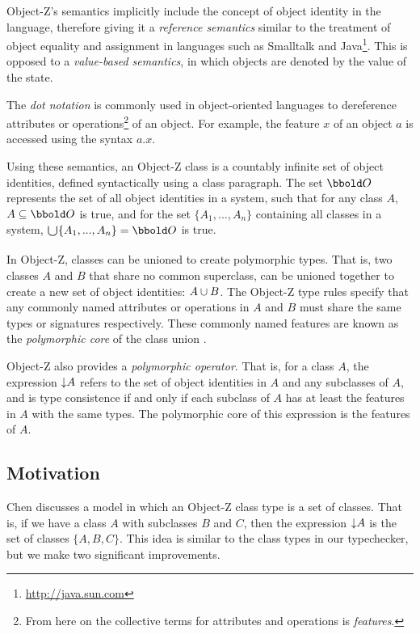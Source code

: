 Object-Z's semantics implicitly include the concept of object identity
in the language, therefore giving it a {\em reference semantics}
similar to the treatment of object equality and assignment in
languages such as Smalltalk \cite{goldberg83} and
Java\footnote{\url{http://java.sun.com}}. This is opposed to a {\em
value-based semantics}, in which objects are denoted by the value of
the state.

The {\em dot notation} is commonly used in object-oriented languages
to dereference attributes or operations\footnote{From here on
the collective terms for attributes and operations is {\em features}.}
of an object. For example, the feature $x$ of an object $a$ is
accessed using the syntax $a.x$.

Using these semantics, an Object-Z class is a countably infinite set
of object identities, defined syntactically using a class
paragraph. The set $\oid$ represents the set of all object identities
in a system, such that for any class $A$, $A \subseteq \oid$ is true,
and for the set $\{ A_{1}, ..., A_{n} \}$ containing all classes in a
system, $\duni \{ A_{1}, ..., A_{n} \} = \oid$ is true.

In Object-Z, classes can be unioned to create polymorphic types. That
is, two classes $A$ and $B$ that share no common superclass, can be
unioned together to create a new set of object identities: $A
\classuni B$. The Object-Z type rules specify that any commonly named
attributes or operations in $A$ and $B$ must share the same types or
signatures respectively. These commonly named features are known as
the {\em polymorphic core} of the class union \cite{dong93}.

Object-Z also provides a {\em polymorphic operator}. That is, for a
class $A$, the expression $\mathord\downarrow A$ refers to the set of object
identities in $A$ and any subclasses of $A$, and is type consistence
if and only if each subclass of $A$ has at least the features in $A$
with the same types. The polymorphic core of this expression is the
features of $A$.

\subsection{Motivation}

Chen \cite{chen94} discusses a model in which an Object-Z class type
is a set of classes. That is, if we have a class $A$ with subclasses
$B$ and $C$, then the expression $\mathord\downarrow A$ is the set of classes $\{A,
B, C\}$. This idea is similar to the class types in our typechecker,
but we make two significant improvements.

